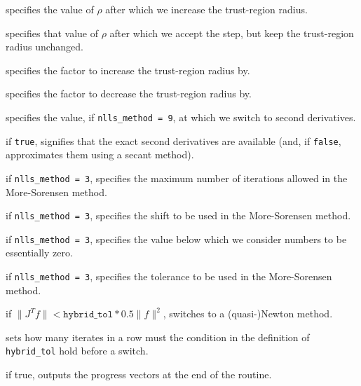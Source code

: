 \documentclass{spec}
\begin{document}
\begin{description}
 specifies the value of $\rho$ after which we increase the trust-region radius.

 specifies that value of $\rho$ after which we accept the step, 
but keep the trust-region radius unchanged.

 specifies the factor to increase the trust-region radius by.

 specifies the factor to decrease the trust-region radius by.

 specifies the value, if {\tt nlls\_method = 9}, 
at which we switch to second derivatives.

 if {\tt true}, signifies that the
exact second derivatives are available (and, if {\tt false}, approximates them using a secant method).

 if {\tt nlls\_method = 3}, specifies the maximum number of iterations allowed in the More-Sorensen method.

 if {\tt nlls\_method = 3}, specifies the shift to be used in the More-Sorensen method.

 if {\tt nlls\_method = 3}, specifies the value
below which we consider numbers to be essentially zero.

 if {\tt nlls\_method = 3}, specifies the tolerance
to be used in the More-Sorensen method.

 if \(\|J^T f \| < \mathtt{hybrid\_tol} * 0.5 \|f\|^2\), switches to a (quasi-)Newton method.

 sets how many iterates in a row must 
the condition in the definition of {\tt hybrid\_tol} hold before a switch.

 if true, outputs the progress vectors at the end of the routine.

\end{description}
\end{document}
